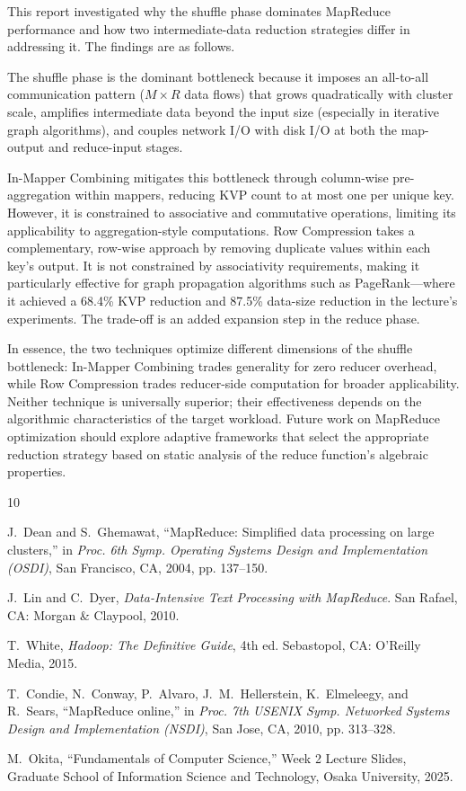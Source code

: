 \documentclass[a4paper,11pt]{article}
\begin{document}
This report investigated why the shuffle phase dominates MapReduce performance and how two intermediate-data reduction strategies differ in addressing it. The findings are as follows.

The shuffle phase is the dominant bottleneck because it imposes an all-to-all communication pattern ($M \times R$ data flows) that grows quadratically with cluster scale, amplifies intermediate data beyond the input size (especially in iterative graph algorithms), and couples network I/O with disk I/O at both the map-output and reduce-input stages.

In-Mapper Combining mitigates this bottleneck through column-wise pre-aggregation within mappers, reducing KVP count to at most one per unique key. However, it is constrained to associative and commutative operations, limiting its applicability to aggregation-style computations. Row Compression takes a complementary, row-wise approach by removing duplicate values within each key's output. It is not constrained by associativity requirements, making it particularly effective for graph propagation algorithms such as PageRank---where it achieved a 68.4\% KVP reduction and 87.5\% data-size reduction in the lecture's experiments. The trade-off is an added expansion step in the reduce phase.

In essence, the two techniques optimize different dimensions of the shuffle bottleneck: In-Mapper Combining trades generality for zero reducer overhead, while Row Compression trades reducer-side computation for broader applicability. Neither technique is universally superior; their effectiveness depends on the algorithmic characteristics of the target workload. Future work on MapReduce optimization should explore adaptive frameworks that select the appropriate reduction strategy based on static analysis of the reduce function's algebraic properties.

\begin{thebibliography}{10}

J.~Dean and S.~Ghemawat,
``MapReduce: Simplified data processing on large clusters,''
in \textit{Proc. 6th Symp. Operating Systems Design and Implementation (OSDI)}, San Francisco, CA, 2004, pp. 137--150.

J.~Lin and C.~Dyer,
\textit{Data-Intensive Text Processing with MapReduce}.
San Rafael, CA: Morgan \& Claypool, 2010.

T.~White,
\textit{Hadoop: The Definitive Guide}, 4th ed.
Sebastopol, CA: O'Reilly Media, 2015.

T.~Condie, N.~Conway, P.~Alvaro, J.~M.~Hellerstein, K.~Elmeleegy, and R.~Sears,
``MapReduce online,''
in \textit{Proc. 7th USENIX Symp. Networked Systems Design and Implementation (NSDI)}, San Jose, CA, 2010, pp. 313--328.

M.~Okita,
``Fundamentals of Computer Science,'' Week 2 Lecture Slides, Graduate School of Information Science and Technology, Osaka University, 2025.

\end{thebibliography}
\end{document}
